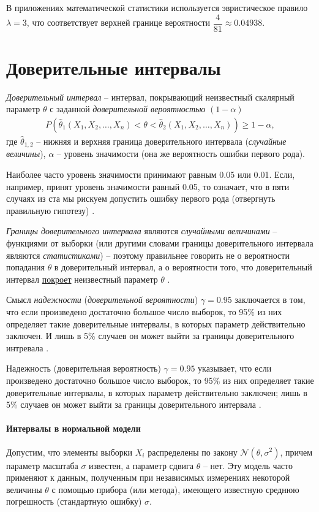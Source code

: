 \documentclass[%
	11pt,
	a4paper,
	utf8,
		]{article}
\begin{document}
В приложениях математической статистики используется эвристическое правило $ \lambda = 3 $, что соответствует верхней границе вероятности $ \dfrac{4}{81} \approx 0.04938 $.


\section{Доверительные интервалы}

\emph{Доверительный интервал} -- интервал, покрывающий неизвестный скалярный параметр $ \theta $ с заданной \emph{доверительной вероятностью} $ (1 - \alpha) $
\begin{align*}
	P(\hat{\theta}_1(X_1, X_2, \dots, X_n) < \theta < \hat{\theta}_2(X_1, X_2, \dots, X_n)) \geqslant 1 - \alpha,
\end{align*}
где $ \hat{\theta}_{1,2} $ -- нижняя и верхняя граница доверительного интервала (\emph{случайные величины}), $ \alpha $ -- уровень значимости (она же вероятность ошибки первого рода).

Наиболее часто уровень значимости принимают равным 0.05 или 0.01. Если, например, принят уровень значимости равный 0.05, то означает, что в пяти случаях из ста мы рискуем допустить ошибку первого рода (отвергнуть правильную гипотезу) \cite[284]{gmurman:1972}.

\emph{Границы доверительного интервала} являются \emph{случайными величинами} -- функциями от выборки (или другими словами границы доверительного интервала являются \emph{статистиками}) -- поэтому правильнее говорить не о вероятности попадания $ \theta $ в доверительный интервал, а о вероятности того, что доверительный интервал \underline{покроет} неизвестный параметр $ \theta $ \cite[]{gmurman:1972}.

Смысл \emph{надежности} (\emph{доверительной вероятности}) $ \gamma = 0.95 $ заключается в том, что если произведено достаточно большое число выборок, то 95\% из них определяет такие доверительные интервалы, в которых параметр действительно заключен. И лишь в 5\% случаев он может выйти за границы доверительного интревала \cite[]{gmurman:1972}.

Надежность (доверительная вероятность) $\gamma = 0.95$ указывает, что если произведено достаточно большое число выборок, то 95\% из них определяет такие доверительные интервалы, в которых параметр действительно заключен; лишь в 5\% случаев он может выйти за границы доверительного интервала \cite[]{gmurman:1972}.

\paragraph{Интервалы в нормальной модели} Допустим, что элементы выборки $ X_i $ распределены по закону $ \mathcal{N}(\theta, \sigma^2) $, причем параметр масштаба $ \sigma $ известен, а параметр сдвига $ \theta $ -- нет. Эту модель часто применяют к данным, полученным при независимых измерениях некоторой величины $ \theta $ с помощью прибора (или метода), имеющего известную среднюю погрешность (стандартную ошибку) $ \sigma $.
\end{document}

